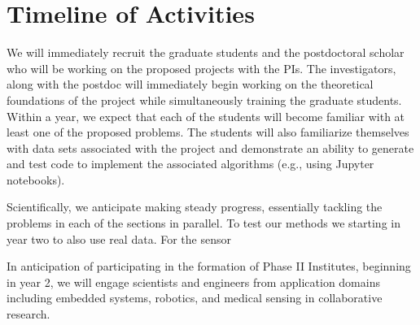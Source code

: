 \section{Timeline of Activities}
We will immediately recruit the graduate students and the postdoctoral scholar who will be working on the proposed projects with the PIs. The investigators, along with the postdoc will immediately begin working on the theoretical foundations of the project while simultaneously training the graduate students. Within a year, we expect that each of the students will become familiar with at least one of the proposed problems. The students will also familiarize themselves with data sets associated with the project and demonstrate an ability to generate and test code to implement the associated algorithms (e.g., using Jupyter notebooks). 

Scientifically, we anticipate making steady progress, essentially tackling the problems in each of the sections in parallel. To test our methods we starting in year two to also use real data. For the sensor 

In anticipation of participating in the formation of Phase II Institutes, beginning in year 2, we will  engage scientists and engineers from application domains including embedded systems, robotics, and medical sensing in collaborative research. 